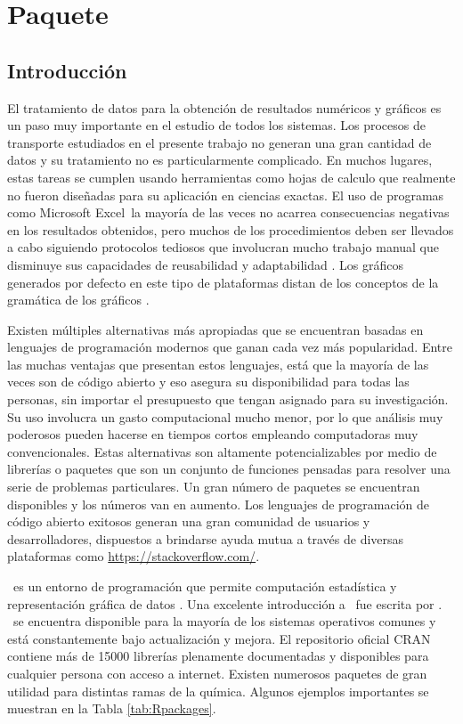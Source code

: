 \chapter{Paquete \trm}\label{sec:transmem66i}

\section{Introducción}
El tratamiento de datos para la obtención de resultados numéricos y gráficos es un paso muy importante en el estudio de todos los sistemas. Los procesos de transporte estudiados en el presente trabajo no generan una gran cantidad de datos y su tratamiento no es particularmente complicado. En muchos lugares, estas tareas se cumplen usando herramientas como hojas de calculo que realmente no fueron diseñadas para su aplicación en ciencias exactas. El uso de programas como Microsoft Excel\textregistered\ la mayoría de las veces no acarrea consecuencias negativas en los resultados obtenidos, pero muchos de los procedimientos deben ser llevados a cabo siguiendo protocolos tediosos que involucran mucho trabajo {manual} que disminuye sus capacidades de reusabilidad y adaptabilidad \citep{Incerti2019}. Los gráficos generados por defecto en este tipo de plataformas distan de los conceptos de la gramática de los gráficos \citep{Wilkinson2005}. 

Existen múltiples alternativas más apropiadas que se encuentran basadas en lenguajes de programación modernos que ganan cada vez más popularidad. Entre las muchas ventajas que presentan estos lenguajes, está que la mayoría de las veces son de código abierto y eso asegura su disponibilidad para todas las personas, sin importar el presupuesto que tengan asignado para su investigación. Su uso involucra un gasto computacional mucho menor, por lo que análisis muy poderosos pueden hacerse en tiempos cortos empleando computadoras muy convencionales. Estas alternativas son altamente potencializables por medio de librerías o {paquetes} que son un conjunto de funciones pensadas para resolver una serie de problemas particulares. Un gran número de paquetes se encuentran disponibles y los números van en aumento. Los lenguajes de programación de código abierto exitosos generan una gran comunidad de usuarios y desarrolladores, dispuestos a brindarse ayuda mutua a través de diversas plataformas como \url{https://stackoverflow.com/}.


\R\ es un entorno de programación que permite computación estadística y representación gráfica de datos \citep{R}. Una excelente introducción a \R\ fue escrita por \citet{Venables2004}. \R\ se encuentra disponible para la mayoría de los sistemas operativos comunes y está constantemente bajo actualización y mejora. El repositorio oficial \ac{CRAN} contiene más de 15000 librerías plenamente documentadas y disponibles para cualquier persona con acceso a internet. Existen numerosos paquetes de gran utilidad para distintas ramas de la química. Algunos ejemplos importantes se muestran en la Tabla \ref{tab:Rpackages}.


